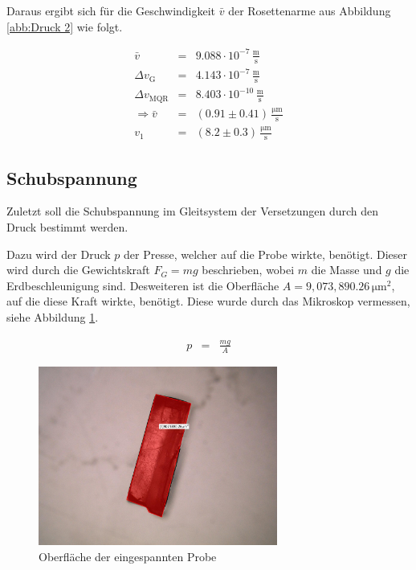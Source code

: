 \documentclass[12pt,a4paper]{scrartcl}
\numberwithin{equation}{section} %
\begin{document}
\noindent
Daraus ergibt sich für die Geschwindigkeit $\bar v$ der Rosettenarme aus Abbildung \ref{abb:Druck 2} wie folgt.

\begin{eqnarray}
    \bar{v} &=& 9.088 \cdot 10^{-7} \mathrm{\,\frac{m}{s}} \\
    \Delta v_\mathrm{G} &=& 4.143 \cdot 10^{-7} \mathrm{\,\frac{m}{s}} \\
    \Delta v_\mathrm{MQR} &=& 8.403 \cdot 10^{-10} \mathrm{\,\frac{m}{s}} \\
    \Rightarrow \bar{v} &=& (0.91 \pm 0.41) \mathrm{\,\frac{\mu m}{s}} \\
    v_1 &=& (8.2 \pm 0.3) \mathrm{\,\frac{\mu m}{s}}
\end{eqnarray}

\hypertarget{schubspannung}{%
\subsection{Schubspannung}\label{schubspannung}}

Zuletzt soll die Schubspannung im Gleitsystem der Versetzungen durch den Druck bestimmt werden.

Dazu wird der Druck $p$ der Presse, welcher auf die Probe wirkte, benötigt. Dieser wird durch die Gewichtskraft $F_G=mg$ beschrieben, wobei $m$ die Masse und $g$ die Erdbeschleunigung sind. Desweiteren ist die Oberfläche $A=9,073,890.26\mathrm{\,\mu m^2}$, auf die diese Kraft wirkte, benötigt. Diese wurde durch das Mikroskop vermessen, siehe Abbildung \ref{abb:Querschnitt}.

\begin{eqnarray}
    p &=& \frac{mg}{A} \label{Druck}
\end{eqnarray}

\begin{figure}[ht]
	\centering
	\includegraphics[width=0.7\textwidth]{../media/B2.8/Querschnittsflaeche_tempered.pdf}
	\caption{Oberfläche der eingespannten Probe}
	\label{abb:Querschnitt}
\end{figure}
\end{document}
